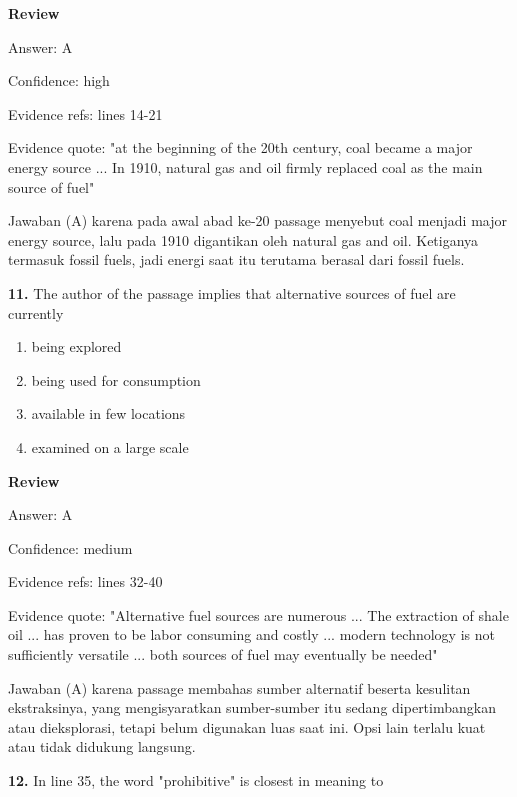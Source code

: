 \documentclass[12pt]{article}
\begin{document}
\par
\begingroup
\setlength{\parskip}{0pt}
\setlength{\parindent}{0pt}
\textbf{Review}\par
Answer: A\par
Confidence: high\par
Evidence refs: lines 14-21\par
Evidence quote: "at the beginning of the 20th century, coal became a major energy source ... In 1910, natural gas and oil firmly replaced coal as the main source of fuel"\par
Jawaban (A) karena pada awal abad ke-20 passage menyebut coal menjadi major energy source, lalu pada 1910 digantikan oleh natural gas and oil. Ketiganya termasuk fossil fuels, jadi energi saat itu terutama berasal dari fossil fuels.\par
\endgroup
\par
\vspace{0.25\baselineskip}
\noindent\textbf{11.} The author of the passage implies that alternative sources of fuel are currently
\begin{enumerate}[label=(\Alph*),leftmargin=*,itemsep=0.2em]
\item being explored
\item being used for consumption
\item available in few locations
\item examined on a large scale
\end{enumerate}
\par
\begingroup
\setlength{\parskip}{0pt}
\setlength{\parindent}{0pt}
\textbf{Review}\par
Answer: A\par
Confidence: medium\par
Evidence refs: lines 32-40\par
Evidence quote: "Alternative fuel sources are numerous ... The extraction of shale oil ... has proven to be labor consuming and costly ... modern technology is not sufficiently versatile ... both sources of fuel may eventually be needed"\par
Jawaban (A) karena passage membahas sumber alternatif beserta kesulitan ekstraksinya, yang mengisyaratkan sumber-sumber itu sedang dipertimbangkan atau dieksplorasi, tetapi belum digunakan luas saat ini. Opsi lain terlalu kuat atau tidak didukung langsung.\par
\endgroup
\par
\vspace{0.25\baselineskip}
\noindent\textbf{12.} In line 35, the word "prohibitive" is closest in meaning to
\end{document}
